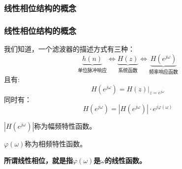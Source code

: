 \documentclass[notheorems,compress,mathserif,table]{beamer}
\begin{document}
\subsubsection{线性相位结构的概念}
\begin{frame}\frametitle{线性相位结构的概念}%


我们知道，一个滤波器的描述方式有三种：
$$\underbrace{h(n)}_{\mbox{单位脉冲响应}}\Longleftrightarrow \underbrace{H(z)}_{\mbox{系统函数}}\Longleftrightarrow \underbrace{H(e^{j\omega})}_{\mbox{频率响应函数}}$$
且有:
$$H(e^{j\omega})=H(z)|_{z=e^{j\omega}}$$
同时有：
$$H(e^{j\omega})= |H(e^{j\omega})|\cdot e^{j\varphi(\omega)}$$

\par $|H(e^{j\omega})|$称为幅频特性函数。
\par $\varphi(\omega)$称为相频特性函数。
\par \textbf{所谓线性相位，就是指$\varphi(\omega)$是$\omega$的线性函数。}
\end{frame}
\end{document}
